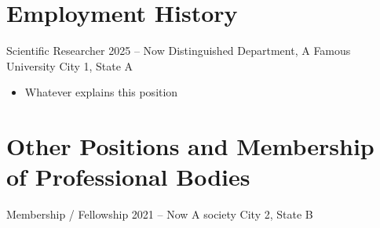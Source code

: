 \documentclass[a4paper,11pt]{article}
\begin{document}

\makeheader %

%
%
\begin{acmedia}
	\EntrySeparator
	\EntrySeparator
	\EntrySeparator
\end{acmedia}


\section{Employment History}


\experience
	{Scientific Researcher}
	{2025 -- Now}
	{Distinguished Department, A Famous University}
	{City 1, State A}
	{\begin{itemize}
		\item[-] Whatever explains this position
	\end{itemize}}


\section{Other Positions and Membership of Professional Bodies}

\experience
	{Membership / Fellowship}
	{2021 -- Now}
	{A society}
	{City 2, State B}{}
\end{document}
